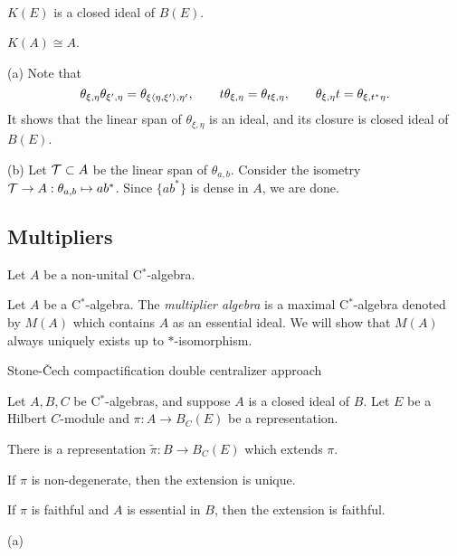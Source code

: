 \documentclass{../../../small}
\begin{document}
\begin{prop}\,
\begin{parts}
\item $K(E)$ is a closed ideal of $B(E)$.
\item $K(A)\cong A$.
\end{parts}
\end{prop}
\begin{pf}
(a)
Note that
\[\theta_{\xi,\eta}\theta_{\xi',\eta}=\theta_{\xi\langle\eta,\xi'\rangle,\eta'},\qquad t\theta_{\xi,\eta}=\theta_{t\xi,\eta},\qquad\theta_{\xi,\eta}t=\theta_{\xi,t^*\eta}.\]
It shows that the linear span of $\theta_{\xi,\eta}$ is an ideal, and its closure is closed ideal of $B(E)$.

(b)
Let $\mathcal{T}\subset A$ be the linear span of $\theta_{a,b}$. 
Consider the isometry $\mathcal{T}\to A:\theta_{a,b}\mapsto ab^*$.
Since $\{ab^*\}$ is dense in $A$, we are done.

\end{pf}









\subsection{Multipliers}

Let $A$ be a non-unital C$^*$-algebra.

\begin{defn}
Let $A$ be a C$^*$-algebra.
The \emph{multiplier algebra} is a maximal C$^*$-algebra denoted by $M(A)$ which contains $A$ as an essential ideal.
We will show that $M(A)$ always uniquely exists up to $*$-isomorphism.
\end{defn}

Stone-\v Cech compactification
double centralizer approach


\begin{prop}
Let $A, B, C$ be C$^*$-algebras, and suppose $A$ is a closed ideal of $B$.
Let $E$ be a Hilbert $ C$-module and $\pi:A\to B_ C(E)$ be a representation.
\begin{parts}
\item
There is a representation $\tilde\pi: B\to B_ C(E)$ which extends $\pi$.
\item If $\pi$ is non-degenerate, then the extension is unique.
\item If $\pi$ is faithful and $A$ is essential in $B$, then the extension is faithful.
\end{parts}
\end{prop}
\begin{pf}
(a)

\end{pf}
\end{document}
